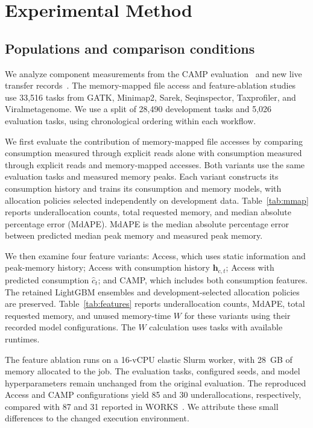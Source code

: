 \section{Experimental Method}
\label{sec:experiments}
\subsection{Populations and comparison conditions}
We analyze component measurements from the CAMP evaluation~\cite{campArtifact}
and new live transfer records~\cite{campTransferArtifact}. The memory-mapped
file access and feature-ablation studies use 33,516 tasks from GATK,
Minimap2, Sarek, Seqinspector, Taxprofiler, and Viralmetagenome. We use a
split of 28,490 development tasks and 5,026 evaluation tasks, using
chronological ordering within each workflow.

We first evaluate the contribution of memory-mapped file accesses by
comparing consumption measured through explicit reads alone with
consumption measured through explicit reads and memory-mapped accesses.
Both variants use the same evaluation tasks and measured memory peaks.
Each variant constructs its consumption history and trains its consumption
and memory models, with allocation policies selected independently on
development data. Table~\ref{tab:mmap} reports underallocation counts, total
requested memory, and median absolute percentage error (MdAPE). MdAPE
is the median absolute percentage error between predicted median peak
memory and measured peak memory.

\label{sec:training-calibration}
We then examine four feature variants: Access, which uses static
information and peak-memory history; Access with consumption history
$\mathbf{h}_{c,t}$; Access with predicted consumption $\hat c_t$; and CAMP,
which includes both consumption features. The retained LightGBM ensembles
and development-selected allocation policies are preserved.
Table~\ref{tab:features} reports underallocation counts, MdAPE, total
requested memory, and unused memory-time $W$ for these variants using
their recorded model configurations. The $W$ calculation uses tasks with
available runtimes.

The feature ablation runs on a 16-vCPU elastic Slurm worker, with 28~GB
of memory allocated to the job. The evaluation tasks, configured seeds,
and model hyperparameters remain unchanged from the original evaluation.
The reproduced Access and CAMP configurations yield 85 and 30
underallocations, respectively, compared with 87 and 31 reported in
WORKS~\cite{camp2026works}. We attribute these small differences to the
changed execution environment.

